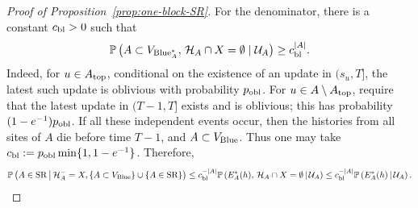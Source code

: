 \documentclass[letterpaper,11pt,reqno]{amsart}
\theoremstyle{definition}
\begin{document}
\begin{proof}[Proof of Proposition~\ref{prop:one-block-SR}]
For the denominator, there is a constant
\(c_{\rm bl}>0\) such that
\[
\mathbb{P}\left(
A\subset V_{\mathrm{Blue}_{A}^{*}},\,
\mathcal{H}_{A}\cap X=\emptyset
\mid \mathcal{U}_A
\right)
        \ge
        c_{\rm bl}^{|A|}.
\]
Indeed, for \(u\in A_{\rm top}\), conditional on the existence of an update in
\((s_u,T]\), the latest such update is oblivious with probability
\(p_{\rm obl}\). For \(u\in A\setminus A_{\rm top}\), require that the latest
update in \((T-1,T]\) exists and is oblivious; this has probability
\((1-e^{-1})p_{\rm obl}\). If all these independent events occur, then the
histories from all sites of \(A\) die before time \(T-1\), and \(A\subset
V_{\rm Blue}\). Thus one may take $c_{\rm bl}:=p_{\rm obl}\min\{1,1-e^{-1}\}$. Therefore,
\begin{align*}
\mathbb P
\left(
    A\in{\rm SR}
    \,\middle|\,
    \mathcal H_A^-=X,
    \{A\subset V_{\rm Blue}\}\cup\{A\in{\rm SR}\}
\right)  
\leq
c_{\rm bl}^{-|A|}
        \mathbb P
        \left(
            E_A^*(h),\,
\mathcal{H}_{A}\cap  X=\emptyset
            \,\middle|\,
            \mathcal U_A
        \right)
\leq
c_{\rm bl}^{-|A|}
        \mathbb P
        \left(
            E_A^*(h)
            \,\middle|\,
            \mathcal U_A
        \right).
\end{align*}






\end{proof}
\end{document}
